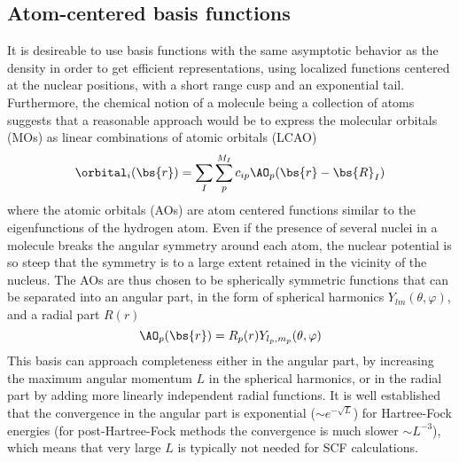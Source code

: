 \subsection{Atom-centered basis functions}
It is desireable to use basis functions with the same asymptotic behavior as the density in order 
to get efficient representations, using localized functions centered at the nuclear positions, with 
a short range cusp and an exponential tail. Furthermore, the chemical notion of a molecule being 
a collection of atoms suggests that a reasonable approach would be to express the molecular orbitals 
(MOs) as linear combinations of atomic orbitals (LCAO)
\begin{equation}
    \orbital_i(\bs{r}) = \sum_I\sum_p^{M_I} c_{ip}\AO_p(\bs{r}-\bs{R}_I) 
\end{equation}
where the atomic orbitals (AOs) are atom centered functions similar to the eigenfunctions of the 
hydrogen atom. Even if the presence of several nuclei in a molecule breaks the angular symmetry
around each atom, the nuclear potential is so steep that the symmetry is to a large extent retained
in the vicinity of the nucleus. The AOs are thus chosen to be spherically symmetric functions that 
can be separated into an angular part, in the form of spherical harmonics $Y_{lm}(\theta,\varphi)$, 
and a radial part $R(r)$
\begin{equation}
    \AO_p (\bs{r}) = R_p(r)Y_{l_p,m_p}(\theta,\varphi)
\end{equation}
This basis can approach completeness either in the angular part, by increasing the maximum angular 
momentum $L$ in the spherical harmonics, or in the radial part by adding more linearly independent
radial functions. It is well established that the convergence in the angular part is exponential
($\sim e^{-\sqrt{L}}$) for Hartree-Fock energies (for post-Hartree-Fock methods the convergence is much 
slower $\sim L^{-3}$), which means that very large $L$ is typically not needed for SCF calculations. 

